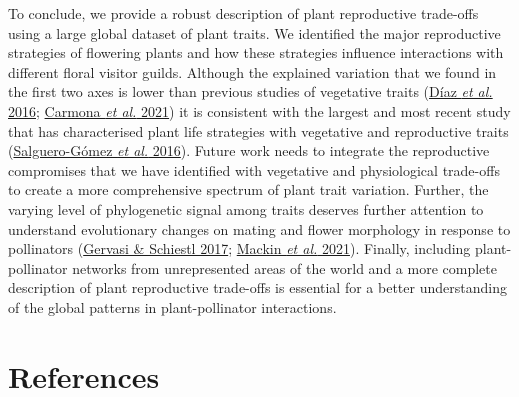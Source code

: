\documentclass[
  12pt,
  a4paper,
]{article}
\begin{document}
To conclude, we provide a robust description of plant reproductive trade-offs using a large global dataset of plant traits. We identified the major reproductive strategies of flowering plants and how these strategies influence interactions with different floral visitor guilds. Although the explained variation that we found in the first two axes is lower than previous studies of vegetative traits (\protect\hyperlink{ref-diaz2016}{Díaz \emph{et al.} 2016}; \protect\hyperlink{ref-carmona2021}{Carmona \emph{et al.} 2021}) it is consistent with the largest and most recent study that has characterised plant life strategies with vegetative and reproductive traits (\protect\hyperlink{ref-salguero2016}{Salguero-Gómez \emph{et al.} 2016}). Future work needs to integrate the reproductive compromises that we have identified with vegetative and physiological trade-offs to create a more comprehensive spectrum of plant trait variation. Further, the varying level of phylogenetic signal among traits deserves further attention to understand evolutionary changes on mating and flower morphology in response to pollinators (\protect\hyperlink{ref-gervasi2017}{Gervasi \& Schiestl 2017}; \protect\hyperlink{ref-mackin2021}{Mackin \emph{et al.} 2021}). Finally, including plant-pollinator networks from unrepresented areas of the world and a more complete description of plant reproductive trade-offs is essential for a better understanding of the global patterns in plant-pollinator interactions.

\hypertarget{references}{%
\section{References}\label{references}}
\end{document}
